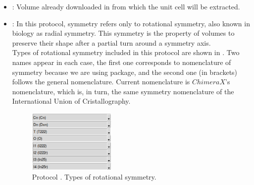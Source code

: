 \begin{itemize}
  \begin{itemize}
  \item {}: Volume already downloaded in \scipion from which the unit cell will be extracted.
  \item {}: In this protocol, symmetry refers only to rotational symmetry, also known in biology as radial symmetry. This symmetry is the property of volumes to preserve their shape after a partial turn around a symmetry axis.  \\
  Types of rotational symmetry included in this protocol are shown in . Two names appear in each case, the first one corresponds to  nomenclature of symmetry because we are using  package, and the second one (in brackets) follows the general \scipion nomenclature. Current \scipion nomenclature is $ChimeraX$'s nomenclature, which is, in turn, the same symmetry nomenclature of the International Union of Cristallography. 
  
    \begin{figure}[H]
    \centering 
    \captionsetup{width=.7\linewidth} 
    \includegraphics[width=0.4\textwidth]{Images_appendix/Fig108.pdf}
    \caption{Protocol . Types of rotational symmetry.}
    \label{fig:app_protocol_extractUnitCell_2}
   \end{figure}
   

\end{itemize}
\end{itemize}
